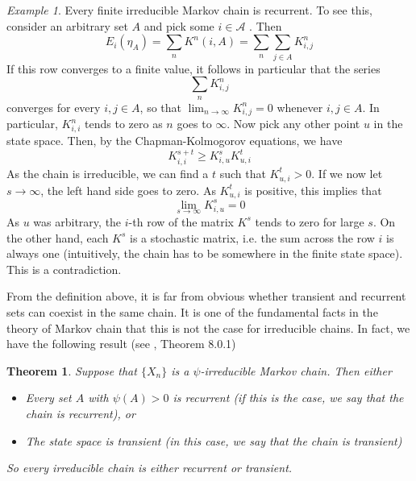 \documentclass[a4paper, draft]{article}
\theoremstyle{own}
\newtheorem{thm}{Theorem}[section]
\theoremstyle{remark}
\newtheorem{example}{Example}[section]
\begin{document}
\begin{example}\label{ex:finitechainsarerecurrent}
	Every finite irreducible Markov chain is recurrent. To see this, consider an arbitrary set $A$ and pick some $i \in \mathcal A$ . Then
	$$
	E_i(\eta_A) = \sum_n K^n(i,A) = \sum_n \sum_{j \in A} K^n_{i,j} 
	$$
	If this row converges to a finite value, it follows in particular that the series 
	$$
	\sum_n K^n_{i,j}
	$$
	converges for every $i,j \in A$, so that $\lim_{n \rightarrow \infty} K^n_{i,j} = 0$ whenever $i,j \in A$. In particular, $K^n_{i,i}$ tends to zero as $n$ goes to $\infty$. Now pick any other point $u$ in the state space. Then, by the Chapman-Kolmogorov equations, we have
	$$
	K^{s+t}_{i,i} \geq K^s_{i,u} K^t_{u,i}
	$$
	As the chain is irreducible, we can find a $t$ such that $K^t_{u,i} > 0$. If we now let $s \rightarrow \infty$, the left hand side goes to zero. As $K^t_{u,i}$ is positive, this implies that
	$$
	\lim_{s \rightarrow \infty} K^s_{i,u} = 0
	$$
	As $u$ was arbitrary, the $i$-th row of the matrix $K^s$ tends to zero for large $s$. On the other hand, each $K^s$ is a stochastic matrix, i.e. the sum across the row $i$ is always one (intuitively, the chain has to be somewhere in the finite state space). This is a contradiction. 
\end{example}

From the definition above, it is far from obvious whether transient and recurrent sets can coexist in the same chain. It is one of the fundamental facts in the theory of Markov chain that this is not the case for irreducible chains. In fact, we have the following result (see \cite{MeynTweedie}, Theorem 8.0.1)

\begin{thm}
	Suppose that $\{ X_n \}$ is a $\psi$-irreducible Markov chain. Then either
	\begin{itemize}
		\item Every set $A$ with $\psi(A) > 0$ is recurrent (if this is the case, we say that the chain is recurrent), or
		\item The state space is transient (in this case, we say that the chain is transient)
	\end{itemize}
	So every irreducible chain is either recurrent or transient.
\end{thm}
\end{document}

